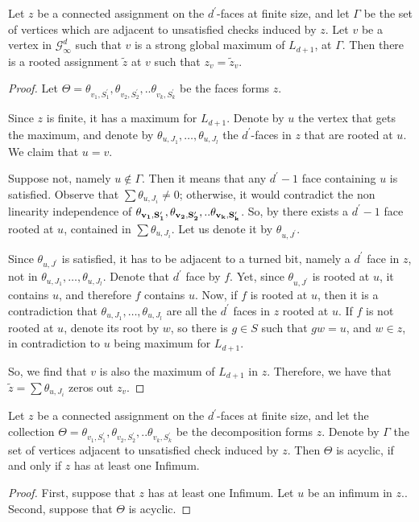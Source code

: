 \begin{claim}
  Let $z$ be a connected assignment on the $d^{\prime}$-faces at finite size, and let $\Gamma$ be the set of vertices which are adjacent to unsatisfied checks induced by $z$. Let $v$ be a vertex in $\mathcal{G}^{d}_{\infty}$ such that $v$ is a strong global maximum of $L_{d+1}$, at $\Gamma$. Then there is a rooted assignment $\tilde{z}$ at $v$ such that $z_{v} = \tilde{z}_{v}$. 
\end{claim}
\begin{proof}
  Let $ \Theta = \theta_{v_{1},S^{\prime}_{1}}, \theta_{v_{2},S^{\prime}_{2}},.. \theta_{v_{k},S^{\prime}_{k}}$ be the faces forms $z$. 


  Since $z$ is finite, it has a maximum for $L_{d+1}$. Denote by $u$ the vertex that gets the maximum, and denote by $\theta_{u,J_{1}}, \ldots, \theta_{u,J_{l}}$ the $d^{\prime}$-faces in $z$ that are rooted at $u$. We claim that $u = v$.

  Suppose not, namely $u \notin \Gamma$. Then it means that any $d^{\prime}-1$ face containing $u$ is satisfied. Observe that $\sum \theta_{u,J_{i}} \neq 0$; otherwise, it would contradict the non linearity independence of  $\mathbf{\theta_{v_{1} ,S^{\prime}_{1}} }, \mathbf{\theta_{v_{2} ,S^{\prime}_{2}} },.. \mathbf{\theta_{v_{k} ,S^{\prime}_{k}} }$. So, by  there exists a $d^{\prime}-1$ face rooted at $u$, contained in $\sum \theta_{u,J_{i}}$. Let us denote it by $\theta_{u,J^{\prime}}$.

Since $\theta_{u,J^{\prime}}$ is satisfied, it has to be adjacent to a turned bit, namely a $d^{\prime}$ face in $z$, not in $\theta_{u,J_{1}}, \ldots, \theta_{u,J_{l}}$. Denote that $d^{\prime}$ face by $f$. Yet, since $\theta_{u,J^{\prime}}$ is rooted at $u$, it contains $u$, and therefore $f$ contains $u$. Now, if $f$ is rooted at $u$, then it is a contradiction that $\theta_{u,J_{1}}, \ldots, \theta_{u,J_{l}}$ are all the $d^{\prime}$ faces in $z$ rooted at $u$. If $f$ is not rooted at $u$, denote its root by $w$, so there is $g \in S$ such that $gw = u$, and $w \in z$, in contradiction to $u$ being maximum for $L_{d+1}$.


So, we find that $v$ is also the maximum of $L_{d+1}$ in $z$. Therefore, we have that $\tilde{z} = \sum \theta_{u, J_{i}}$ zeros out $z_{v}$.
\end{proof}





\begin{claim}
  Let $z$ be a connected assignment on the $d^{\prime}$-faces at finite size, and let the collection $\Theta = \theta_{v_{1},S^{\prime}_{1}}, \theta_{v_{2},S^{\prime}_{2}},.. \theta_{v_{k},S^{\prime}_{k}}$ be the decomposition forms $z$. Denote by $\Gamma$ the set of vertices adjacent to unsatisfied check induced by $z$. Then $\Theta$ is acyclic, if and only if $z$ has at least one Infimum. 
\end{claim}
\begin{proof}
  First, suppose that $z$ has at least one Infimum. Let $u$ be an infimum in $z$.. 
  Second, suppose that $\Theta$ is acyclic. 
\end{proof}



